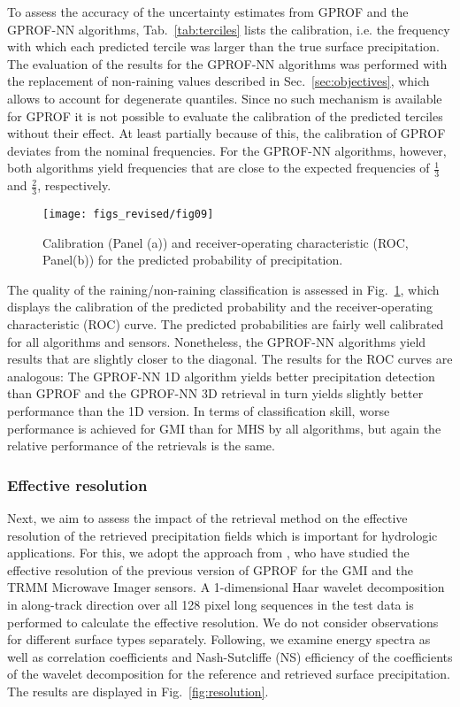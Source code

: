 \documentclass[journal abbreviation, manuscript]{copernicus}
\begin{document}
To assess the accuracy of the uncertainty estimates from GPROF and the GPROF-NN
algorithms, Tab.~\ref{tab:terciles} lists the calibration, i.e. the frequency
with which each predicted tercile was larger than the true surface
precipitation. The evaluation of the results for the GPROF-NN algorithms was
performed with the replacement of non-raining values described in
Sec.~\ref{sec:objectives}, which allows to account for degenerate quantiles.
Since no such mechanism is available for GPROF it is not possible to evaluate
the calibration of the predicted terciles without their effect. At least
partially because of this, the calibration of GPROF deviates from the nominal
frequencies. For the GPROF-NN algorithms, however, both algorithms yield
frequencies that are close to the expected frequencies of $\frac{1}{3}$ and
$\frac{2}{3}$, respectively.

\begin{figure}[hbpt!]
  \centering
  \texttt{[image: figs\_revised/fig09]}
  \caption{
    Calibration (Panel (a)) and receiver-operating characteristic (ROC, Panel(b)) for
    the predicted probability of precipitation.
  }
  \label{fig:results_pop}
\end{figure}

The quality of the raining/non-raining classification is assessed in
Fig.~\ref{fig:results_pop}, which displays the calibration of the predicted
probability and the receiver-operating characteristic (ROC) curve. The predicted
probabilities are fairly well calibrated for all algorithms and sensors.
Nonetheless, the GPROF-NN algorithms yield results that are slightly closer to
the diagonal. The results for the ROC curves are analogous: The GPROF-NN 1D
algorithm yields better precipitation detection than GPROF and the GPROF-NN 3D
retrieval in turn yields slightly better performance than the 1D version. In
terms of classification skill, worse performance is achieved for GMI than for
MHS by all algorithms, but again the relative performance of the retrievals
is the same.

\subsubsection{Effective resolution}
\label{sec:effective_resolution}

Next, we aim to assess the impact of the retrieval method on the effective
resolution of the retrieved precipitation fields which is important for hydrologic
applications. For this, we adopt the approach from \citet{guilloteau17}, who
have studied the effective resolution of the previous version of GPROF for the
GMI and the TRMM Microwave Imager sensors. A 1-dimensional Haar wavelet
decomposition in along-track direction over all 128 pixel long sequences in the
test data is performed to calculate the effective resolution. We do not consider
observations for different surface types separately. Following,
\citet{guilloteau17} we examine energy spectra as well as correlation
coefficients and Nash-Sutcliffe (NS) efficiency of the coefficients of the
wavelet decomposition for the reference and retrieved surface precipitation. The
results are displayed in Fig.~\ref{fig:resolution}.
\end{document}
